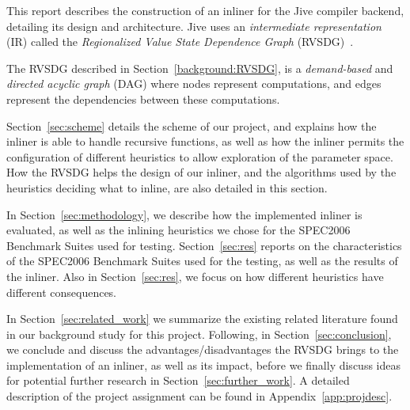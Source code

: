 This report describes the construction of an inliner for the Jive compiler
backend, detailing its design and architecture. Jive uses an
\textit{intermediate representation} (IR) called the \textit{Regionalized Value
State Dependence Graph} (RVSDG)~\cite{RVSDG:HiPEACpaper}.

The RVSDG described in Section~\ref{background:RVSDG},
is a \textit{demand-based} and \textit{directed acyclic graph} (DAG) where nodes
represent computations, and edges represent the dependencies between these
computations.

Section~\ref{sec:scheme} details the scheme of our project, and explains how the
inliner is able to handle recursive functions, as well as how the inliner
permits the configuration of different heuristics to allow exploration of the
parameter space. How the RVSDG helps the design of our inliner, and the
algorithms used by the heuristics deciding what to inline, are also detailed in
this section.

In Section~\ref{sec:methodology}, we describe how the implemented inliner is
evaluated, as well as the inlining heuristics we chose for the SPEC2006
Benchmark Suites used for testing. Section~\ref{sec:res} reports on the
characteristics of the SPEC2006 Benchmark Suites used for the testing, as well
as the results of the inliner. Also in Section~\ref{sec:res}, we focus on how
different heuristics have different consequences.

In Section~\ref{sec:related_work} we summarize the existing related literature
found in our background study for this project. Following, in
Section~\ref{sec:conclusion}, we conclude and discuss the
advantages/disadvantages the RVSDG brings to the implementation of an inliner,
as well as its impact, before we finally discuss ideas for potential further
research in Section~\ref{sec:further_work}. A detailed description of the
project assignment can be found in Appendix~\ref{app:projdesc}.
